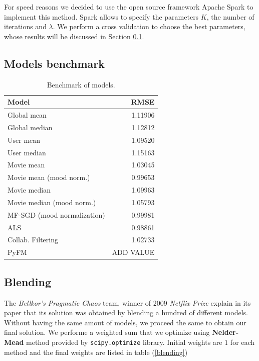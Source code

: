 \documentclass[10pt,conference,compsocconf]{IEEEtran}
\begin{document}
For speed reasons we decided to use the open source framework Apache Spark to implement this method.
Spark allows to specify the parameters $K$, the number of iterations and $\lambda$. We perform a
cross validation to choose the best parameters, whose results will be discussed in Section 
\ref{sec:model_bench}.


\subsection{Models benchmark}
\label{sec:model_bench}

\begin{table}[htbp]
\centering
\begin{tabular}[c]{| l r |}
\hline
Model & RMSE \\
\hline 
\hline
Global mean					& 1.11906	\\
Global median 					& 1.12812	\\
User mean 					& 1.09520 \\
User median					& 1.15163 \\
Movie mean					& 1.03045 \\
Movie mean (mood norm.)		& 0.99653 \\
Movie median					& 1.09963 \\
Movie median (mood norm.)		& 1.05793 \\
MF-SGD (mood normalization) 		& 0.99981 \\
ALS							& 0.98861 \\
Collab. Filtering					& 1.02733 \\
PyFM                        & ADD VALUE \\
\hline


\end{tabular}
  \caption{Benchmark of models.}
  \label{benchmark}
\end{table}




\subsection{Blending}

The \textit{Bellkor's Pragmatic Chaos} team, winner of 2009 \textit{Netflix Prize} explain in its paper that its solution was obtained by blending a hundred of different models. \cite{BellKore_netflix} Without having the same amout of models, we proceed the same to obtain our final solution. We performe a weighted sum that we optimize using \textbf{Nelder-Mead} method provided by \texttt{scipy.optimize} library. Initial weights are $1$ for each method and the final weights are listed in table (\ref{blending})
\end{document}
